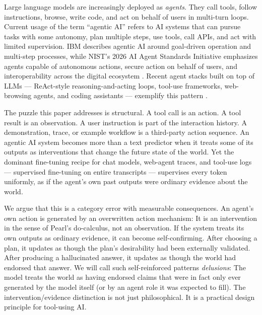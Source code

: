 \documentclass[11pt]{article}
\begin{document}
Large language models are increasingly deployed as \emph{agents}. They call tools, follow instructions, browse, write code, and act on behalf of users in multi-turn loops. Current usage of the term ``agentic AI'' refers to AI systems that can pursue tasks with some autonomy, plan multiple steps, use tools, call APIs, and act with limited supervision. IBM describes agentic AI around goal-driven operation and multi-step processes, while NIST's 2026 AI Agent Standards Initiative emphasizes agents capable of autonomous actions, secure action on behalf of users, and interoperability across the digital ecosystem \citep{ibmAgenticAI,nistAgentStandards2026}. Recent agent stacks built on top of LLMs --- ReAct-style reasoning-and-acting loops, tool-use frameworks, web-browsing agents, and coding assistants --- exemplify this pattern \citep{yao2022react,schick2023toolformer,nakano2022webgpt,wang2023voyager,patil2023gorilla}.

The puzzle this paper addresses is structural. A tool call is an action. A tool result is an observation. A user instruction is part of the interaction history. A demonstration, trace, or example workflow is a third-party action sequence. An agentic AI system becomes more than a text predictor when it treats some of its outputs as interventions that change the future state of the world. Yet the dominant fine-tuning recipe for chat models, web-agent traces, and tool-use logs --- supervised fine-tuning on entire transcripts --- supervises every token uniformly, as if the agent's own past outputs were ordinary evidence about the world.

We argue that this is a category error with measurable consequences. An agent's own action is generated by an overwritten action mechanism: It is an intervention in the sense of Pearl's do-calculus, not an observation. If the system treats its own outputs as ordinary evidence, it can become self-confirming. After choosing a plan, it updates as though the plan's desirability had been externally validated. After producing a hallucinated answer, it updates as though the world had endorsed that answer. We will call such self-reinforced patterns \emph{delusions}: The model treats the world as having endorsed claims that were in fact only ever generated by the model itself (or by an agent role it was expected to fill). The intervention/evidence distinction is not just philosophical. It is a practical design principle for tool-using AI.
\end{document}
